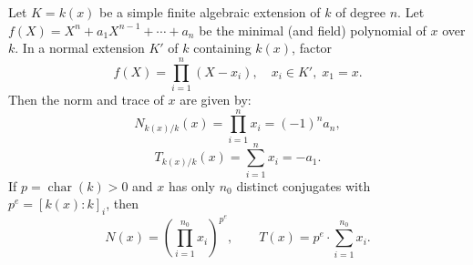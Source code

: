 Let $K = k(x)$ be a simple finite algebraic extension of $k$ of degree $n$. Let $f(X) = X^n + a_1 X^{n-1} + \cdots + a_n$ be the minimal (and field) polynomial of $x$ over $k$. In a normal extension $K'$ of $k$ containing $k(x)$, factor
$$f(X) = \prod_{i=1}^{n} (X - x_i), \quad x_i \in K', \; x_1 = x.$$
Then the norm and trace of $x$ are given by:
$$N_{k(x)/k}(x) = \prod_{i=1}^{n} x_i = (-1)^n a_n,$$
$$T_{k(x)/k}(x) = \sum_{i=1}^{n} x_i = -a_1.$$
If $p = \operatorname{char}(k) > 0$ and $x$ has only $n_0$ distinct conjugates with $p^e = [k(x):k]_i$, then
$$N(x) = \left(\prod_{i=1}^{n_0} x_i\right)^{p^e}, \qquad T(x) = p^e \cdot \sum_{i=1}^{n_0} x_i.$$
